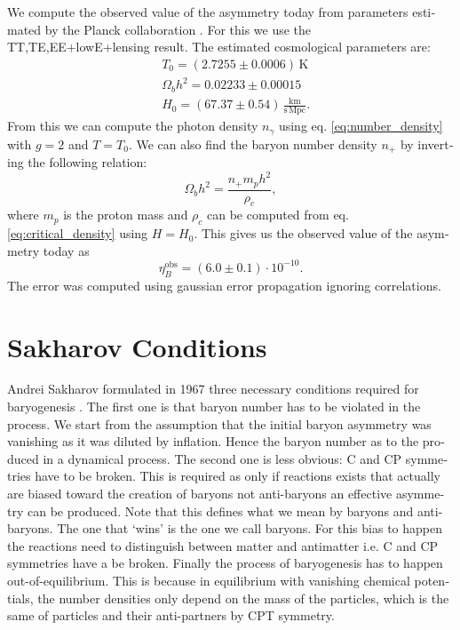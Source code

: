 \documentclass[master,       %
               twoside,        %
               BCOR10mm,       %
               english,ngerman, %
               ]{GAUBM}
\begin{document}
\begin{otherlanguage}{english}
We compute the observed value of the asymmetry today from parameters estimated by the Planck collaboration \cite{planck2018}. For this we use the TT,TE,EE+lowE+lensing result.
The estimated cosmological parameters are:
\begin{align}
	&T_0 = (2.7255 \pm 0.0006) \, \mathrm{K} \nonumber \\
	&\Omega_b h^2 = 0.02233 \pm 0.00015 \nonumber \\
	&H_0 = (67.37 \pm 0.54) \, \frac{\mathrm{km}}{\mathrm{s} \,  \mathrm{Mpc}}.
\end{align}
From this we can compute the photon density $n_\gamma$ using eq. \eqref{eq:number_density} with $g = 2$ and $T = T_0$.
We can also find the baryon number density $n_+$ by inverting the following relation:
\begin{equation}
	\Omega_b h^2 = \frac{n_+ m_p h^2}{\rho_c},
\end{equation}
where $m_p$ is the proton mass and $\rho_c$ can be computed from eq. \eqref{eq:critical_density} using $H = H_0$.
This gives us the observed value of the asymmetry today as
\begin{equation}
	\eta_B^\mathrm{obs} = (6.0 \pm 0.1) \cdot 10^{-10}.
\end{equation}
The error was computed using gaussian error propagation ignoring correlations. 

\section{Sakharov Conditions}
Andrei Sakharov formulated in 1967 three necessary conditions required for baryogenesis \cite{Sakharov_1991}.
The first one is that baryon number has to be violated in the process. We start from the assumption that the initial baryon asymmetry was vanishing as it was diluted by inflation.
Hence the baryon number as to the produced in a dynamical process.
The second one is less obvious: C and CP symmetries have to be broken.
This is required as only if
reactions exists that actually are biased toward the creation of baryons not anti-baryons an effective asymmetry can be produced. Note that this defines what we mean by baryons and anti-baryons. The one that `wins' is the one we call baryons.
For this bias to happen the reactions need to distinguish between matter and antimatter i.e. C and CP symmetries have a be broken.
Finally the process of baryogenesis has to happen out-of-equilibrium. This is because
in equilibrium with vanishing chemical potentials, the number densities only depend on the mass of the particles, which is the same of particles and their anti-partners by CPT symmetry.



\end{otherlanguage}
\end{document}

